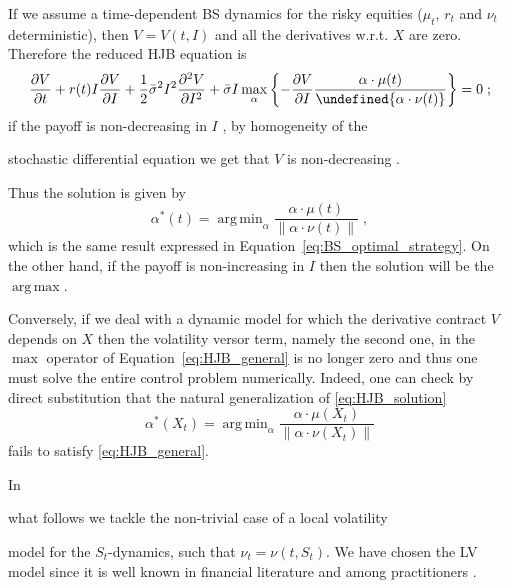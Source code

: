 \documentclass[runningheads]{m2ef}
\DeclareMathOperator*{\argmax}{arg\,max}
\DeclareMathOperator*{\argmin}{arg\,min}
\let\norm\undefined %
\DeclarePairedDelimiter\norm{\lVert}{\rVert}
\newcommand\soutpars[1]{\let\helpcmd\sout\parhelp#1\par\relax\relax}
\newcommand{\change}[1]{{\color{red} {#1}}}%
\newcommand{\remove}[1]{{\color{red} \soutpars{{#1}}}}%
\begin{document}
If we assume a time-dependent BS dynamics for the risky equities ($\mu_t$, $r_t$ and $\nu_t$ deterministic), then $V = V(t,I)$ and all the derivatives w.r.t. $X$ are zero. Therefore the reduced HJB equation is
\begin{equation}
	\frac{\partial V}{\partial t} +  r(t) I \frac{\partial V}{\partial I}  + \frac{1}{2}\bar{\sigma}^2I^2\frac{\partial^2V}{\partial I^2} + \bar{\sigma}I\max_\alpha \left\{ -\frac{\partial V}{\partial I}   \frac{\alpha \cdot \mu(t)}{\norm{\alpha \cdot \nu(t)}}\right\} = 0 \; ;
\end{equation}
if the payoff is non-decreasing in $I$\change{,} by homogeneity of the \remove{SDE} \change{stochastic differential equation} we get that $V$ is non-decreasing\change{.}\remove{; t}\change{T}hus the solution is given by
\begin{equation}\label{eq:HJB_solution}
 \alpha^*(t) = \argmin_\alpha \frac{\alpha \cdot \mu(t)}{\|\alpha \cdot \nu(t)\|} \; ,
\end{equation}
which is the same result expressed in Equation~\eqref{eq:BS_optimal_strategy}. On the other hand, if the payoff is non-increasing in $I$ then the solution will be the $\argmax$.

Conversely, if we deal with a dynamic model for which the derivative contract $V$ depends on $X$ then the volatility versor term, namely the second one, in the $\max$ operator of Equation~\eqref{eq:HJB_general} is no longer zero and thus one must solve the entire control problem numerically. \change{Indeed, one can check by direct substitution that the natural generalization of \eqref{eq:HJB_solution}
\begin{equation}
 \alpha^*(X_t) = \argmin_\alpha \frac{\alpha \cdot \mu(X_t)}{\|\alpha \cdot \nu(X_t)\|}
\end{equation}
fails to satisfy \eqref{eq:HJB_general}.}

In \remove{this work}\change{what follows} we tackle the non-trivial case of a local volatility \remove{(LV)} model for the $S_t$-dynamics, such that $\nu_t = \nu(t,S_t)$. We have chosen the LV model since it is well known in financial literature and among practitioners \change{\cite{Gatheral2006}}.
\end{document}
